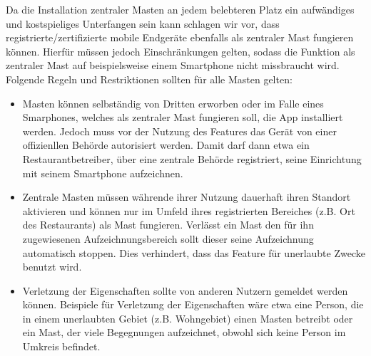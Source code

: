 \documentclass[conference]{IEEEtran}
\begin{document}
Da die Installation zentraler Masten an jedem belebteren Platz ein aufwändiges und kostspieliges Unterfangen sein kann schlagen wir vor, dass registrierte/zertifizierte mobile Endgeräte ebenfalls als zentraler Mast fungieren können. 
Hierfür müssen jedoch Einschränkungen gelten, sodass die Funktion als zentraler Mast auf beispielsweise einem Smartphone nicht missbraucht wird.
Folgende Regeln und Restriktionen sollten für alle Masten gelten:
\begin{itemize}
	\item Masten können selbständig von Dritten erworben oder im Falle eines Smarphones, welches als zentraler Mast fungieren soll, die App installiert werden. 
	Jedoch muss vor der Nutzung des Features das Gerät von einer offizienllen Behörde autorisiert werden. Damit darf dann etwa ein Restaurantbetreiber, über eine zentrale Behörde registriert, seine Einrichtung mit seinem Smartphone aufzeichnen. 
	\item Zentrale Masten müssen währende ihrer Nutzung dauerhaft ihren Standort aktivieren und können nur im Umfeld ihres registrierten Bereiches (z.B. Ort des Restaurants) als Mast fungieren. 
	Verlässt ein Mast den für ihn zugewiesenen Aufzeichnungsbereich sollt dieser seine Aufzeichnung automatisch stoppen. Dies verhindert, dass das Feature für unerlaubte Zwecke benutzt wird.
	\item Verletzung der Eigenschaften sollte von anderen Nutzern gemeldet werden können. 
	Beispiele für Verletzung der Eigenschaften wäre etwa eine Person, die in einem unerlaubten Gebiet (z.B. Wohngebiet) einen Masten betreibt oder ein Mast, der viele Begegnungen aufzeichnet, obwohl sich keine Person im Umkreis befindet.  
\end{itemize}
\end{document}
